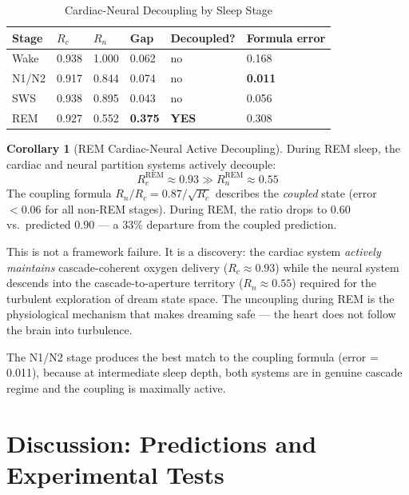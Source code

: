 \documentclass[10pt,twocolumn,a4paper]{article}
\theoremstyle{definition}
\newtheorem{corollary}[theorem]{Corollary}
\begin{document}
\begin{table}[H]
\centering
\caption{Cardiac-Neural Decoupling by Sleep Stage}
\label{tab:cn_decoupling}
\begin{tabular}{llllll}
\toprule
\textbf{Stage} & \textbf{$R_c$} & \textbf{$R_n$} & \textbf{Gap} &
\textbf{Decoupled?} & \textbf{Formula error}\\
\midrule
Wake   & 0.938 & 1.000 & 0.062 & no  & 0.168\\
N1/N2  & 0.917 & 0.844 & 0.074 & no  & \textbf{0.011}\\
SWS    & 0.938 & 0.895 & 0.043 & no  & 0.056\\
REM    & 0.927 & 0.552 & \textbf{0.375} & \textbf{YES} & 0.308\\
\bottomrule
\end{tabular}
\end{table}

\begin{corollary}[REM Cardiac-Neural Active Decoupling]
\label{cor:rem_decoupling}
During REM sleep, the cardiac and neural partition systems actively decouple:
\begin{equation}
R_c^{\mathrm{REM}} \approx 0.93 \gg R_n^{\mathrm{REM}} \approx 0.55
\end{equation}
The coupling formula $R_n/R_c = 0.87/\sqrt{R_c}$ describes the
\emph{coupled} state (error $< 0.06$ for all non-REM stages). During REM,
the ratio drops to $0.60$ vs.\ predicted $0.90$ --- a 33\% departure
from the coupled prediction.
\end{corollary}

This is not a framework failure. It is a discovery: the cardiac system
\emph{actively maintains} cascade-coherent oxygen delivery ($R_c \approx 0.93$)
while the neural system descends into the cascade-to-aperture territory
($R_n \approx 0.55$) required for the turbulent exploration of dream state
space. The uncoupling during REM is the physiological mechanism that makes
dreaming safe --- the heart does not follow the brain into turbulence.

The N1/N2 stage produces the best match to the coupling formula (error = 0.011),
because at intermediate sleep depth, both systems are in genuine cascade
regime and the coupling is maximally active.

\section{Discussion: Predictions and Experimental Tests}
\label{sec:discussion}
\end{document}
